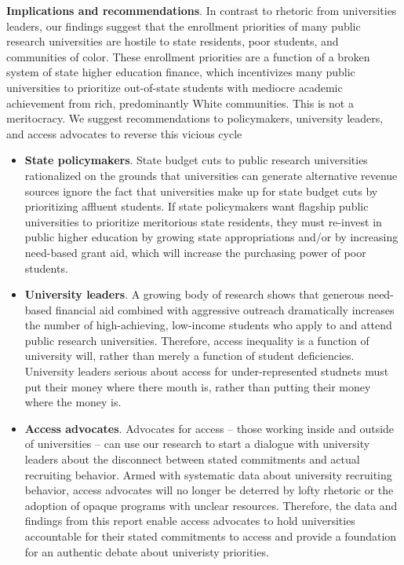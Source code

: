 \documentclass[twoside]{article}
\begin{document}
\textbf{Implications and recommendations}. In contrast to rhetoric from universities leaders, our findings suggest that the enrollment priorities of many public research universities are hostile to state residents, poor students, and communities of color.  These enrollment priorities are a function of a broken system of state higher education finance, which incentivizes many public universities to prioritize out-of-state students with mediocre academic achievement from rich, predominantly White communities. This is not a meritocracy.  We suggest recommendations to policymakers, university leaders, and access advocates to reverse this vicious cycle
	\begin{itemize}
		\item \textbf{State policymakers}. State budget cuts to public research universities rationalized on the grounds that universities can generate alternative revenue sources ignore the fact that universities make up for state budget cuts by prioritizing affluent students.  If state policymakers want flagship public universities to prioritize meritorious state residents, they must re-invest in public higher education by growing state appropriations and/or by increasing need-based grant aid, which will increase the purchasing power of poor students.
		\item \textbf{University leaders}.  A growing body of research shows that generous need-based financial aid combined with aggressive outreach dramatically increases the number of high-achieving, low-income students who apply to and attend public research universities. Therefore, access inequality is a function of university will, rather than merely a function of student deficiencies. University leaders serious about access for under-represented studnets must put their money where there mouth is, rather than putting their money where the money is.
		\item \textbf{Access advocates}.  Advocates for access -- those working inside and outside of universities -- can use our research to start a dialogue with university leaders about the disconnect between stated commitments and actual recruiting behavior. Armed with systematic data about university recruiting behavior, access advocates will no longer be deterred by lofty rhetoric or the adoption of opaque programs with unclear resources. Therefore, the data and findings from this report enable access advocates to hold universities accountable for their stated commitments to access and	provide a foundation for an authentic debate about univeristy priorities.

	\end{itemize}
\end{document}
